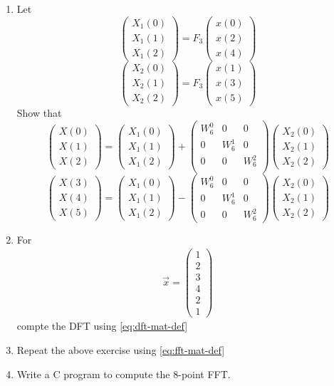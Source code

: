 \documentclass[journal,12pt,twocolumn]{IEEEtran}
\newcommand{\myvec}[1]{\ensuremath{\begin{pmatrix}#1\end{pmatrix}}}
\renewcommand\thesection{\arabic{section}}
\begin{document}
\begin{enumerate}[label=\arabic*.,ref=\thesection.\theenumi]
	\item 
Let 
\begin{equation}
	\myvec{
X_{1}(0) \\ 
X_{1}(1) \\ 
X_{1}(2) 
	}
= F_{3}
	\myvec{
x(0) \\ 
x(2) \\ 
x(4) 
	}
\end{equation}
\begin{equation}
	\myvec{
X_{2}(0) \\ 
X_{2}(1) \\ 
X_{2}(2) 
	}
= F_{3}
	\myvec{
x(1) \\ 
x(3) \\ 
x(5) 
	}
\end{equation}
Show that 
\begin{equation}
	\myvec{
X(0) \\ 
X(1) \\ 
X(2)  
	}
=
	\myvec{
X_{1}(0) \\ 
X_{1}(1)\\ 
X_{1}(2)
	}
+
	\myvec{
W^{0}_{6} & 0 & 0\\
0 & W^{1}_{6} & 0\\
0 & 0 & W^{2}_{6}\\
	}
	\myvec{
X_{2}(0) \\ 
X_{2}(1) \\ 
X_{2}(2)
	}
\end{equation}
\begin{equation}
	\myvec{
X(3) \\ 
X(4) \\ 
X(5) 
	}
=
	\myvec{
X_{1}(0) \\ 
X_{1}(1)\\ 
X_{1}(2)
	}
-
	\myvec{
W^{0}_{6} & 0 & 0\\
0 & W^{1}_{6} & 0\\
0 & 0 & W^{2}_{6}
	}
	\myvec{
X_{2}(0) \\ 
X_{2}(1) \\ 
X_{2}(2)
	}
	    \label{eq:fft-mat-def}
\end{equation}
\item For 
    \begin{align}
	    \vec{x} = \myvec{1\\2\\3\\4\\2\\1}
        \label{eq:equation1}
    \end{align}
    compte the DFT using 
	    \eqref{eq:dft-mat-def}
    \item Repeat the above exercise using
	    \eqref{eq:fft-mat-def}
\item Write a C program to compute the 8-point FFT. 
 \end{enumerate}
\end{document}
